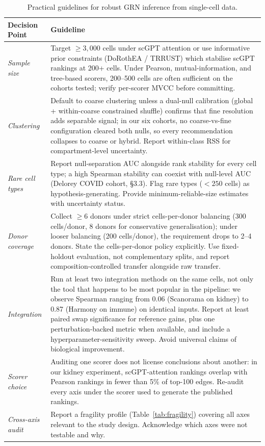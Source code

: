 \documentclass[unnumsec,webpdf,contemporary,large,namedate]{oup-authoring-template}
\begin{document}
\begin{table}[ht]
\centering
\caption{Practical guidelines for robust GRN inference from single-cell data.}
\label{tab:guidelines}
\small
\begin{tabularx}{\textwidth}{lX}
\toprule
\textbf{Decision Point} & \textbf{Guideline} \\
\midrule
\textit{Sample size} &
  Target $\geq 3{,}000$ cells under scGPT attention or use informative
  prior constraints (DoRothEA / TRRUST) which stabilise scGPT rankings
  at 200+ cells. Under Pearson, mutual-information, and tree-based
  scorers, 200--500 cells are often sufficient on the cohorts tested;
  verify per-scorer MVCC before committing. \\
\addlinespace
\textit{Clustering} &
  Default to coarse clustering unless a dual-null calibration (global +
  within-coarse constrained shuffle) confirms that fine resolution
  adds separable signal; in our six cohorts, no coarse-vs-fine
  configuration cleared both nulls, so every recommendation collapses
  to coarse or hybrid. Report within-class RSS for compartment-level
  uncertainty. \\
\addlinespace
\textit{Rare cell types} &
  Report null-separation AUC alongside rank stability for every cell
  type; a high Spearman stability can coexist with null-level AUC
  (Delorey COVID cohort, §3.3). Flag rare types ($< 250$ cells) as
  hypothesis-generating. Provide minimum-reliable-size estimates with
  uncertainty status. \\
\addlinespace
\textit{Donor coverage} &
  Collect $\geq 6$ donors under strict cells-per-donor balancing
  (300 cells/donor, 8 donors for conservative generalisation); under
  looser balancing (200 cells/donor), the requirement drops to 2--4
  donors. State the cells-per-donor policy explicitly. Use
  fixed-holdout evaluation, not complementary splits, and report
  composition-controlled transfer alongside raw transfer. \\
\addlinespace
\textit{Integration} &
  Run at least two integration methods on the same cells, not only the
  tool that happens to be most popular in the pipeline: we observe
  Spearman ranging from 0.06 (Scanorama on kidney) to 0.87 (Harmony
  on immune) on identical inputs. Report at least paired swap
  significance for reference gains, plus one perturbation-backed
  metric when available, and include a hyperparameter-sensitivity
  sweep. Avoid universal claims of biological improvement. \\
\addlinespace
\textit{Scorer choice} &
  Auditing one scorer does not license conclusions about another: in
  our kidney experiment, scGPT-attention rankings overlap with Pearson
  rankings in fewer than 5\% of top-100 edges. Re-audit every axis
  under the scorer used to generate the published rankings. \\
\addlinespace
\textit{Cross-axis audit} &
  Report a fragility profile (Table~\ref{tab:fragility}) covering all
  axes relevant to the study design. Acknowledge which axes were not
  testable and why. \\
\bottomrule
\end{tabularx}
\end{table}
\end{document}
